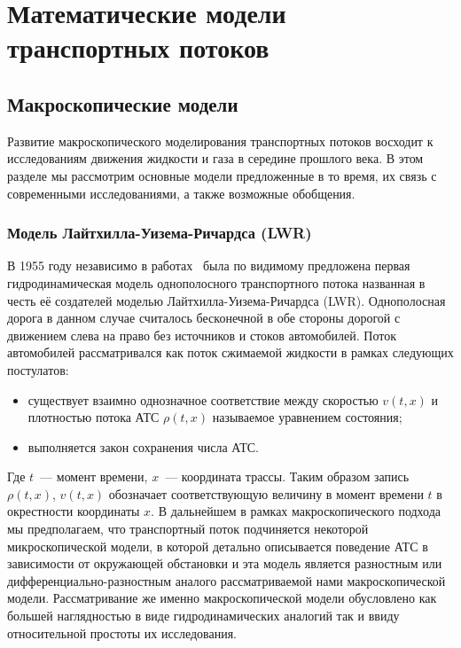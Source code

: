 \chapter{Математические модели транспортных потоков}\label{ch:ch1}

\section{Макроскопические модели}\label{sec:ch1/sec1}

Развитие макроскопического моделирования транспортных потоков восходит к исследованиям движения жидкости и газа в середине прошлого века. 
В этом разделе мы рассмотрим основные модели предложенные в то время, их связь с современными исследованиями, а также возможные обобщения.

\subsection{Модель Лайтхилла-Уизема-Ричардса (LWR)}\label{subsec:ch1/sec1/sub1}

В 1955 году независимо в работах~\cite{LWR/lighthill1955kinematic,richards1956shock} была по видимому предложена первая гидродинамическая модель однополосного транспортного потока названная в честь её создателей моделью Лайтхилла-Уизема-Ричардса (LWR).
Однополосная дорога в данном случае считалось бесконечной в обе стороны дорогой с движением слева на право без источников и стоков автомобилей.
Поток автомобилей рассматривался как поток сжимаемой жидкости в рамках следующих постулатов:
\begin{itemize}
  \item существует взаимно однозначное соответствие между скоростью \(v(t, x)\) и плотностью потока АТС \(\rho(t, x)\) называемое уравнением состояния;
  \item выполняется закон сохранения числа АТС.
\end{itemize}
Где \(t\)~--- момент времени, \(x\)~--- координата трассы.
Таким образом запись \(\rho(t, x)\), \(v(t, x)\) обозначает соответствующую величину в момент времени \(t\) в окрестности координаты \(x\).
В дальнейшем в рамках макроскопического подхода мы предполагаем, что транспортный поток подчиняется некоторой микроскопической модели, в которой детально описывается поведение АТС в зависимости от окружающей обстановки и эта модель является разностным или дифференциально-разностным аналого рассматриваемой нами макроскопической модели.
Рассматривание же именно макроскопической модели обусловлено как большей наглядностью в виде гидродинамических аналогий так и ввиду относительной простоты их исследования.

